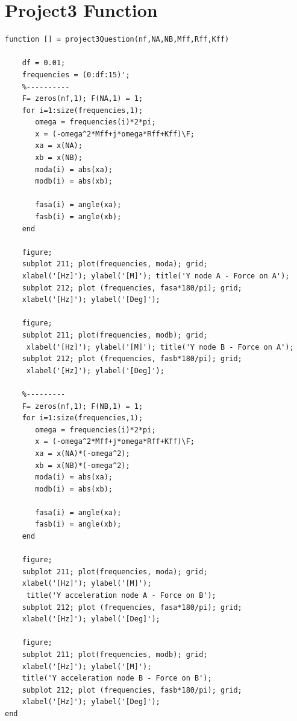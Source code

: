 \documentclass[10pt,a4paper,final]{report}
\begin{document}
\section{Project3 Function}
\begin{lstlisting}
function [] = project3Question(nf,NA,NB,Mff,Rff,Kff)

    df = 0.01;
    frequencies = (0:df:15)';
    %----------
    F= zeros(nf,1); F(NA,1) = 1; 
    for i=1:size(frequencies,1);
       omega = frequencies(i)*2*pi;
       x = (-omega^2*Mff+j*omega*Rff+Kff)\F;
       xa = x(NA);
       xb = x(NB);
       moda(i) = abs(xa);
       modb(i) = abs(xb);

       fasa(i) = angle(xa);
       fasb(i) = angle(xb);
    end

    figure;
    subplot 211; plot(frequencies, moda); grid; 
    xlabel('[Hz]'); ylabel('[M]'); title('Y node A - Force on A');
    subplot 212; plot (frequencies, fasa*180/pi); grid; 
    xlabel('[Hz]'); ylabel('[Deg]');

    figure;
    subplot 211; plot(frequencies, modb); grid;
     xlabel('[Hz]'); ylabel('[M]'); title('Y node B - Force on A');
    subplot 212; plot (frequencies, fasb*180/pi); grid;
     xlabel('[Hz]'); ylabel('[Deg]');

    %---------
    F= zeros(nf,1); F(NB,1) = 1; 
    for i=1:size(frequencies,1);
       omega = frequencies(i)*2*pi;
       x = (-omega^2*Mff+j*omega*Rff+Kff)\F;
       xa = x(NA)*(-omega^2);
       xb = x(NB)*(-omega^2);
       moda(i) = abs(xa);
       modb(i) = abs(xb);

       fasa(i) = angle(xa);
       fasb(i) = angle(xb);
    end

    figure;
    subplot 211; plot(frequencies, moda); grid; 
    xlabel('[Hz]'); ylabel('[M]');
     title('Y acceleration node A - Force on B');
    subplot 212; plot (frequencies, fasa*180/pi); grid; 
    xlabel('[Hz]'); ylabel('[Deg]');

    figure;
    subplot 211; plot(frequencies, modb); grid;
    xlabel('[Hz]'); ylabel('[M]'); 
    title('Y acceleration node B - Force on B');
    subplot 212; plot (frequencies, fasb*180/pi); grid; 
    xlabel('[Hz]'); ylabel('[Deg]');
end
\end{lstlisting}
\newpage
\end{document}
